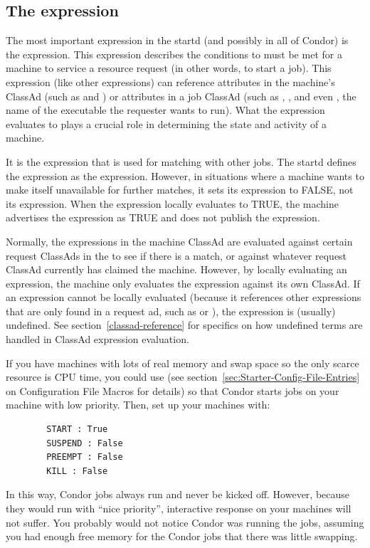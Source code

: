 \subsection{\label{sec:Start-Expr}
The  expression}

The most important expression in the startd (and possibly in all of
Condor) is the  expression.  
This expression describes the conditions to must be met for a
machine to service a resource request (in other words, to start a
job). 
This expression (like other expressions) can reference attributes
in the machine's ClassAd (such as  and )
or attributes in a job ClassAd (such as
, , and even , the name of the
executable the requester wants to run).
What the  expression evaluates to plays a crucial role in
determining the state and activity of a machine.

It is the  expression that is used for
matching with other jobs.
The startd defines the
 expression as the  expression.
However, in situations where a machine wants to make itself
unavailable for further matches, it sets its 
expression to FALSE, not its  expression.  
When the  expression locally evaluates to TRUE, the
machine advertises the  expression as TRUE and
does not publish the  expression.

Normally, the expressions in the machine ClassAd are evaluated against
certain request ClassAds in the  to see if there is
a match, or against whatever request ClassAd currently has claimed the
machine.  However, by locally evaluating an expression, the machine only
evaluates the expression against its own ClassAd.  If an expression
cannot be locally evaluated (because it references other expressions
that are only found in a request ad, such as  or
), the expression is (usually) undefined.
See section~\ref{classad-reference} for specifics on
how undefined terms are handled in ClassAd expression evaluation. 

\Note If you have machines with lots of real memory and swap space so
  the only scarce resource is CPU time, you could use
   (see
  section~\ref{sec:Starter-Config-File-Entries} on 
  Configuration File Macros for details) so that Condor starts jobs on
  your machine with low priority.
  Then, set up your machines with:
\begin{verbatim}
        START : True
        SUSPEND : False
        PREEMPT : False
        KILL : False
\end{verbatim}
  In this way, Condor jobs always run and never be kicked off. 
  However, because they would run with ``nice priority'', interactive 
  response on your machines will not suffer.
  You probably would not notice Condor was running the jobs, 
  assuming you had enough free memory for the Condor jobs that there
  was little swapping.

